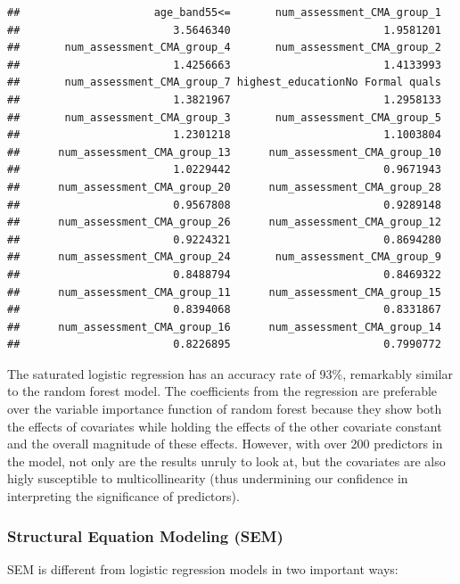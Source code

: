 \documentclass[]{article}
\begin{document}
\begin{verbatim}
##                     age_band55<=       num_assessment_CMA_group_1 
##                        3.5646340                        1.9581201 
##       num_assessment_CMA_group_4       num_assessment_CMA_group_2 
##                        1.4256663                        1.4133993 
##       num_assessment_CMA_group_7 highest_educationNo Formal quals 
##                        1.3821967                        1.2958133 
##       num_assessment_CMA_group_3       num_assessment_CMA_group_5 
##                        1.2301218                        1.1003804 
##      num_assessment_CMA_group_13      num_assessment_CMA_group_10 
##                        1.0229442                        0.9671943 
##      num_assessment_CMA_group_20      num_assessment_CMA_group_28 
##                        0.9567808                        0.9289148 
##      num_assessment_CMA_group_26      num_assessment_CMA_group_12 
##                        0.9224321                        0.8694280 
##      num_assessment_CMA_group_24       num_assessment_CMA_group_9 
##                        0.8488794                        0.8469322 
##      num_assessment_CMA_group_11      num_assessment_CMA_group_15 
##                        0.8394068                        0.8331867 
##      num_assessment_CMA_group_16      num_assessment_CMA_group_14 
##                        0.8226895                        0.7990772
\end{verbatim}

The saturated logistic regression has an accuracy rate of 93\%,
remarkably similar to the random forest model. The coefficients from the
regression are preferable over the variable importance function of
random forest because they show both the effects of covariates while
holding the effects of the other covariate constant and the overall
magnitude of these effects. However, with over 200 predictors in the
model, not only are the results unruly to look at, but the covariates
are also higly susceptible to multicollinearity (thus undermining our
confidence in interpreting the significance of predictors).

\subsubsection{Structural Equation Modeling
(SEM)}\label{structural-equation-modeling-sem}

SEM is different from logistic regression models in two important ways:
\end{document}
